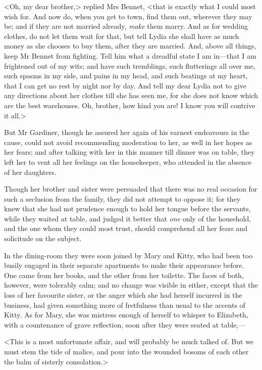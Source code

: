 <Oh, my dear brother,> replied Mrs Bennet, <that is exactly what I could most wish for. And now do, when you get to town, find them out, wherever they may be; and if they are not married already, \textit{make} them marry. And as for wedding clothes, do not let them wait for that, but tell Lydia she shall have as much money as she chooses to buy them, after they are married. And, above all things, keep Mr Bennet from fighting. Tell him what a dreadful state I am in—that I am frightened out of my wits; and have such tremblings, such flutterings all over me, such spasms in my side, and pains in my head, and such beatings at my heart, that I can get no rest by night nor by day. And tell my dear Lydia not to give any directions about her clothes till she has seen me, for she does not know which are the best warehouses. Oh, brother, how kind you are! I know you will contrive it all.>

But Mr Gardiner, though he assured her again of his earnest endeavours in the cause, could not avoid recommending moderation to her, as well in her hopes as her fears; and after talking with her in this manner till dinner was on table, they left her to vent all her feelings on the housekeeper, who attended in the absence of her daughters.

Though her brother and sister were persuaded that there was no real occasion for such a seclusion from the family, they did not attempt to oppose it; for they knew that she had not prudence enough to hold her tongue before the servants, while they waited at table, and judged it better that \textit{one} only of the household, and the one whom they could most trust, should comprehend all her fears and solicitude on the subject.

In the dining-room they were soon joined by Mary and Kitty, who had been too busily engaged in their separate apartments to make their appearance before. One came from her books, and the other from her toilette. The faces of both, however, were tolerably calm; and no change was visible in either, except that the loss of her favourite sister, or the anger which she had herself incurred in the business, had given something more of fretfulness than usual to the accents of Kitty. As for Mary, she was mistress enough of herself to whisper to Elizabeth, with a countenance of grave reflection, soon after they were seated at table,—

<This is a most unfortunate affair, and will probably be much talked of. But we must stem the tide of malice, and pour into the wounded bosoms of each other the balm of sisterly consolation.>

